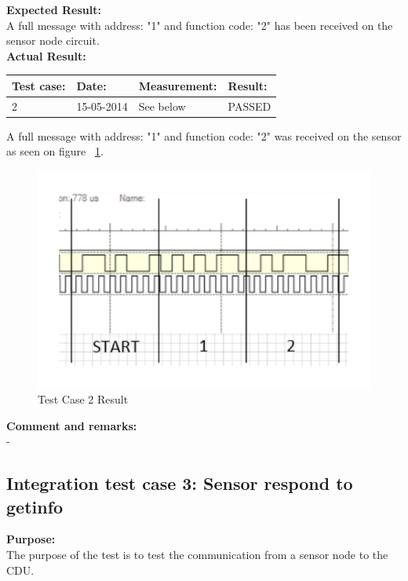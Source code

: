 \textbf{Expected Result:}\\
A full message with address: "1" and function code: "2" has been received on the sensor node circuit.\\

\textbf{Actual Result:}\\
\begin{table}[H]
\centering
\begin{tabular}{|p{2cm}|p{2cm}|p{3cm}|p{2cm}|}\hline
\textbf{Test case:} & \textbf{Date:} & \textbf{Measurement:} & \textbf{Result:} \\ \hline
2 & 15-05-2014 & See below & PASSED \\ \hline
\end{tabular}
\end{table}
A full message with address: "1" and function code: "2" was received on the sensor as seen on figure ~\ref{fig:InteTestCase2}.
\begin{figure}[H]
\centering
\includegraphics[scale=1]{billeder/intetestcase2}
\caption{Test Case 2 Result}
\label{fig:InteTestCase2}
\end{figure}

\textbf{Comment and remarks:}\\
-\\

\subsection{Integration test case 3: Sensor respond to getinfo}
\textbf{Purpose:}\\
The purpose of the test is to test the communication from a sensor node to the CDU.\\

